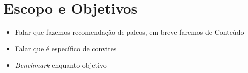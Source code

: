 \section{Escopo e Objetivos}
\begin{itemize}
    \item Falar que fazemos recomendação de palcos, em breve faremos de Conteúdo
    \item Falar que é específico de convites
    \item \textit{Benchmark} enquanto objetivo
\end{itemize}